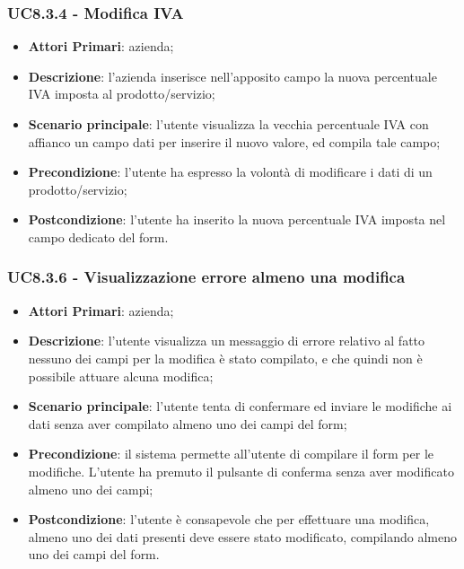 \subsubsection{UC8.3.4 - Modifica IVA}
\begin{itemize}
	\item \textbf{Attori Primari}: azienda;
	\item \textbf{Descrizione}: l'azienda inserisce nell'apposito campo la nuova percentuale IVA imposta al prodotto/servizio;
	\item \textbf{Scenario principale}: l'utente visualizza la vecchia percentuale IVA con affianco un campo dati per inserire il nuovo valore, ed compila tale campo;
	\item \textbf{Precondizione}: l'utente ha espresso la volontà di modificare i dati di un prodotto/servizio;
	\item \textbf{Postcondizione}: l'utente ha inserito la nuova percentuale IVA imposta nel campo dedicato del form.
\end{itemize}

\subsubsection{UC8.3.6 - Visualizzazione errore almeno una modifica}
\begin{itemize}
	\item \textbf{Attori Primari}: azienda;
	\item \textbf{Descrizione}:
	l'utente visualizza un messaggio di errore relativo al fatto nessuno dei campi per la modifica è stato compilato, e che quindi non è possibile attuare alcuna modifica;
	\item \textbf{Scenario principale}: l'utente tenta di confermare ed inviare le modifiche ai dati senza aver compilato almeno uno dei campi del form;
	\item \textbf{Precondizione}: il sistema permette all'utente di compilare il form per le modifiche. L'utente ha premuto il pulsante di conferma senza aver modificato almeno uno dei campi; 
	\item \textbf{Postcondizione}:
	l'utente è consapevole che per effettuare una modifica, almeno uno dei dati presenti deve essere stato modificato, compilando almeno uno dei campi del form.
\end{itemize}

